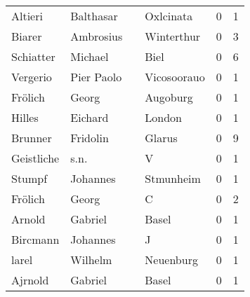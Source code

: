 \begin{center}
\begin{tiny}
\begin{longtabu}{llllrr}
                  Altieri &                          Balthasar &             &                                   Oxlcinata &          0 &         1 \\
                   Biarer &                          Ambrosius &             &                                  Winterthur &          0 &         3 \\
                Schiatter &                            Michael &             &                                        Biel &          0 &         6 \\
                 Vergerio &                         Pier Paolo &             &                                 Vicosoorauo &          0 &         1 \\
                  Frölich &                              Georg &             &                                    Augoburg &          0 &         1 \\
                   Hilles &                            Eichard &             &                                      London &          0 &         1 \\
                  Brunner &                           Fridolin &             &                                      Glarus &          0 &         9 \\
               Geistliche &                               s.n. &             &                                           V &          0 &         1 \\
                   Stumpf &                           Johannes &             &                                   Stmunheim &          0 &         1 \\
                  Frölich &                              Georg &             &                                           C &          0 &         2 \\
                   Arnold &                            Gabriel &             &                                       Basel &          0 &         1 \\
                 Bircmann &                           Johannes &             &                                           J &          0 &         1 \\
                    larel &                            Wilhelm &             &                                   Neuenburg &          0 &         1 \\
                  Ajrnold &                            Gabriel &             &                                       Basel &          0 &         1 \\

\end{longtabu}
\end{tiny}
\end{center}
